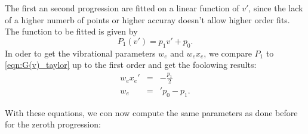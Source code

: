 The first an second progression are fitted on a linear function of $v'$, since 
the lack of a higher numerb of points or higher accuray doesn't allow higher order fits.
The function to be fitted is given by
\begin{equation}
    P_1(v') = p_1 v' + p_0.
\end{equation}
In oder to get the vibrational parameters $w_e$ and $w_e x_e$, we compare $P_1$ to 
\eqref{eqn:G(v)_taylor} up to the first order and get the foolowing results: 
\begin{eqnarray}
    w_e x_e' &=& -\frac{p_1}{2} \\
    w_e &=&' p_0 - p_1.
\end{eqnarray}

With these equations, we con now compute the same parameters as done before for the 
zeroth progression:
